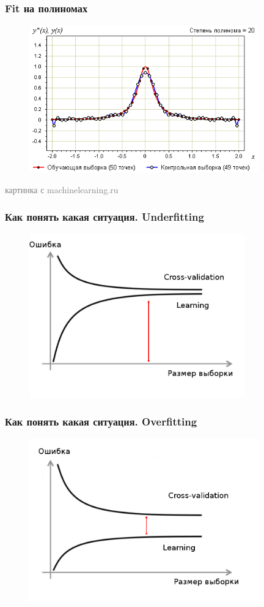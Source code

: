 \documentclass[12pt]{beamer}
\begin{document}
\begin{frame}\frametitle{Fit на полиномах}
\begin{figure}[htbp]
\centering
\includegraphics[height=180pt]{fit}  
\end{figure}

\textcolor{gray}{картинка с machinelearning.ru}
\end{frame}
\begin{frame}\frametitle{Как понять какая ситуация. Underfitting}
\begin{figure}[htbp]
\centering
\includegraphics[height=200pt]{underfit1}  
\end{figure}

\end{frame}

\begin{frame}\frametitle{Как понять какая ситуация. Overfitting}
\begin{figure}[htbp]
\centering
\includegraphics[height=200pt]{overfit1}  
\end{figure}

\end{frame}
\end{document}
